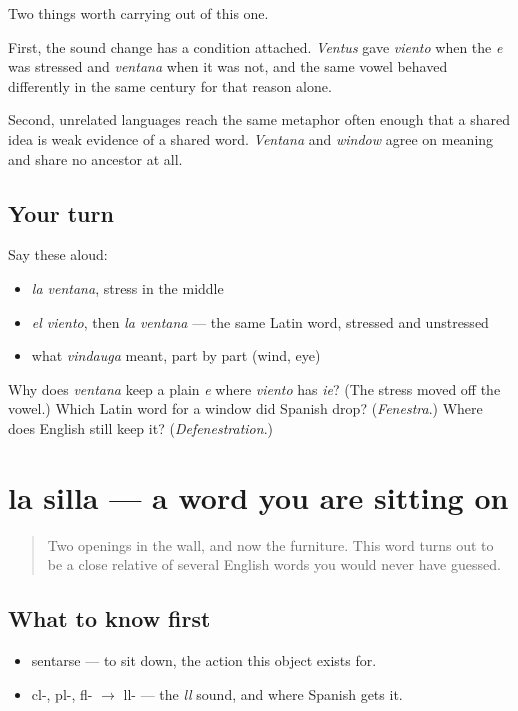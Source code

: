 \begin{grammarlens}[title={What you've built}]
Two things worth carrying out of this one.

First, the sound change has a condition attached. \emph{Ventus} gave \emph{viento} when the \emph{e} was stressed and \emph{ventana} when it was not, and the same vowel behaved differently in the same century for that reason alone.

Second, unrelated languages reach the same metaphor often enough that a shared idea is weak evidence of a shared word. \emph{Ventana} and \emph{window} agree on meaning and share no ancestor at all.
\end{grammarlens}

\subsection*{Your turn}
Say these aloud:

\begin{itemize}
\raggedright
  \item \emph{la ventana}, stress in the middle
  \item \emph{el viento}, then \emph{la ventana} — the same Latin word, stressed and unstressed
  \item what \emph{vindauga} meant, part by part (wind, eye)
\end{itemize}

\begin{tcolorbox}[breakable,colback=teal!4,colframe=teal!35!black,title={Before you move on}]
Why does \emph{ventana} keep a plain \emph{e} where \emph{viento} has \emph{ie}? (The stress moved off the vowel.) Which Latin word for a window did Spanish drop? (\emph{Fenestra}.) Where does English still keep it? (\emph{Defenestration}.)
\end{tcolorbox}
\section[la silla]{la silla — a word you are sitting on}

\label{lesson:ES-C279-silla}



\begin{quote}
Two openings in the wall, and now the furniture. This word turns out to be a close relative of several English words you would never have guessed.
\end{quote}

\subsection*{What to know first}
\begin{itemize}
\raggedright
  \item sentarse — to sit down, the action this object exists for.
  \item cl-, pl-, fl- $\to$ ll- — the \emph{ll} sound, and where Spanish gets it.
\end{itemize}

